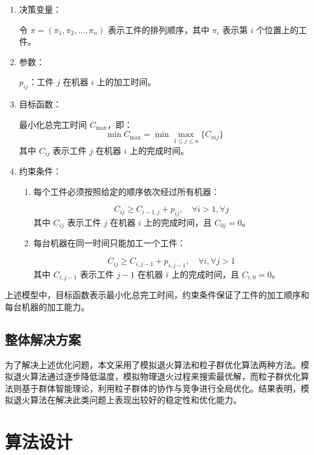 \documentclass[12pt]{article}
\begin{document}
	\begin{enumerate}
		\item 决策变量：
		
		令 \( \pi = (\pi_1, \pi_2, \ldots, \pi_n) \) 表示工件的排列顺序，其中 \( \pi_i \) 表示第 \( i \) 个位置上的工件。
		
		\item 参数：
		
		\( p_{ij} \)：工件 \( j \) 在机器 \( i \) 上的加工时间。
		
		\item 目标函数：
		
		最小化总完工时间 \( C_{\text{max}} \)，即：
		\[
		\min C_{\text{max}} = \min \max_{1 \leq j \leq n} \{ C_{mj} \}
		\]
		其中 \( C_{ij} \) 表示工件 \( j \) 在机器 \( i \) 上的完成时间。
		
		\item 约束条件：
		
		\begin{enumerate}
			\item 每个工件必须按照给定的顺序依次经过所有机器：
			
			\[
			C_{ij} \geq C_{i-1,j} + p_{ij}, \quad \forall i > 1, \forall j
			\]
			其中 \( C_{ij} \) 表示工件 \( j \) 在机器 \( i \) 上的完成时间，且 \( C_{0j} = 0 \)。
			
			\item 每台机器在同一时间只能加工一个工件：
			
			\[
			C_{ij} \geq C_{i,j-1} + p_{i,j-1}, \quad \forall i, \forall j > 1
			\]
			其中 \( C_{i,j-1} \) 表示工件 \( j-1 \) 在机器 \( i \) 上的完成时间，且 \( C_{i,0} = 0 \)。
			
		\end{enumerate}
	\end{enumerate}
	
	上述模型中，目标函数表示最小化总完工时间，约束条件保证了工件的加工顺序和每台机器的加工能力。
	
	\subsection{整体解决方案}
	
	为了解决上述优化问题，本文采用了模拟退火算法和粒子群优化算法两种方法。模拟退火算法通过逐步降低温度，模拟物理退火过程来搜索最优解，而粒子群优化算法则基于群体智能理论，利用粒子群体的协作与竞争进行全局优化。结果表明，模拟退火算法在解决此类问题上表现出较好的稳定性和优化能力。
	
	\section{算法设计}
\end{document}
